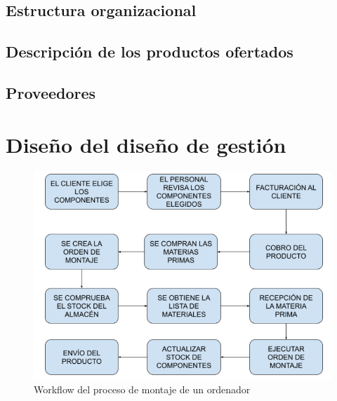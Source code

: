 \documentclass[12pt, letterpaper]{article}
\begin{document}
\subsection{\textsf{Estructura organizacional}}

\subsection{\textsf{Descripción de los productos ofertados}}

\subsection{\textsf{Proveedores}}

\section{\textsf{Diseño del diseño de gestión}}
\begin{figure}[ht]
    \includegraphics[width=\textwidth]{workflow.png}
    \caption{\textsf{Workflow del proceso de montaje de un ordenador}}
    \label{workflow}
\end{figure}

\clearpage
\listoffigures
\clearpage

\end{document}
